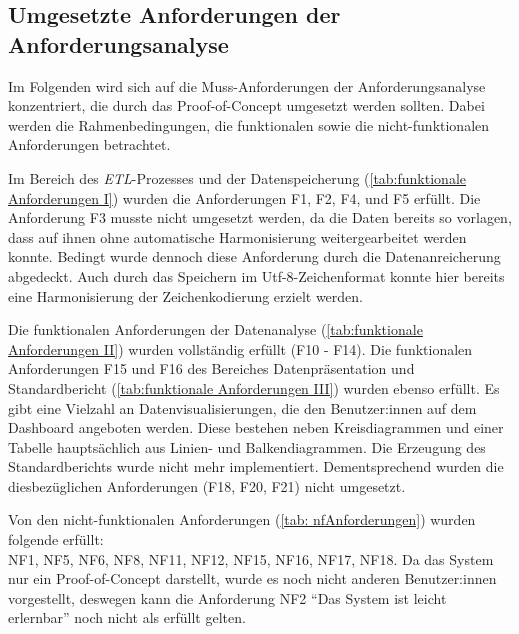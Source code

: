 \subsection{Umgesetzte Anforderungen der Anforderungsanalyse}
Im Folgenden wird sich auf die Muss-Anforderungen der Anforderungsanalyse konzentriert, die durch das Proof-of-Concept
umgesetzt werden sollten. Dabei werden die Rahmenbedingungen, die funktionalen sowie die nicht-funktionalen Anforderungen
betrachtet.

Im Bereich des \textit{\acrshort{ETL}}-Prozesses und der Datenspeicherung (\autoref{tab:funktionale Anforderungen I}) wurden die Anforderungen F1, F2, F4, und F5 erfüllt.
Die Anforderung F3 musste nicht umgesetzt werden, da die Daten bereits so vorlagen, dass auf ihnen ohne automatische Harmonisierung weitergearbeitet werden konnte.
Bedingt wurde dennoch diese Anforderung durch die Datenanreicherung abgedeckt. Auch durch das Speichern im Utf-8-Zeichenformat konnte hier bereits eine Harmonisierung der
Zeichenkodierung erzielt werden.

Die funktionalen Anforderungen der Datenanalyse (\autoref{tab:funktionale Anforderungen II}) wurden vollständig erfüllt (F10 - F14).
Die funktionalen Anforderungen F15 und F16 des Bereiches Datenpräsentation und Standardbericht (\autoref{tab:funktionale Anforderungen III}) 
wurden ebenso erfüllt. Es gibt eine Vielzahl an Datenvisualisierungen, die den Benutzer:innen auf dem Dashboard angeboten werden. 
Diese bestehen neben Kreisdiagrammen und einer Tabelle hauptsächlich aus Linien- und Balkendiagrammen.
Die Erzeugung des Standardberichts wurde nicht mehr implementiert. Dementsprechend wurden die diesbezüglichen
Anforderungen (F18, F20, F21) nicht umgesetzt. 

Von den nicht-funktionalen Anforderungen (\autoref{tab: nfAnforderungen}) wurden folgende erfüllt:\\
NF1, NF5, NF6, NF8, NF11, NF12, NF15, NF16, NF17, NF18. 
Da das System nur ein Proof-of-Concept darstellt, wurde es noch nicht anderen
Benutzer:innen vorgestellt, deswegen kann die Anforderung NF2 \enquote{Das System ist leicht erlernbar} noch nicht als erfüllt gelten.

